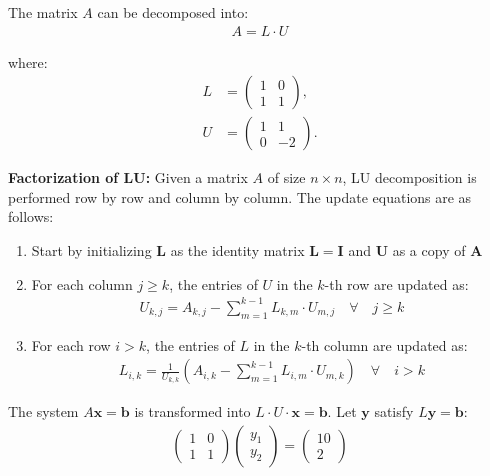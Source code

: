 \documentclass[journal]{IEEEtran}
\begin{document}
The matrix $A$ can be decomposed into:
\begin{align*}
    A = L \cdot U
\end{align*}

where:
\begin{align*}
    L &= \begin{pmatrix}
    1 & 0 \\
    1 & 1
    \end{pmatrix}, \\
    U &= \begin{pmatrix}
    1 & 1 \\
    0 & -2
    \end{pmatrix}.
\end{align*}

\textbf{Factorization of LU:}
Given a matrix $A$ of size $n \times n$, LU decomposition is performed row by row and column by column. The update equations are as follows:
\begin{enumerate}
    \item Start by initializing $\mathbf{L}$ as the identity matrix $\mathbf{L} = \mathbf{I}$ and $\mathbf{U}$ as a copy of $\mathbf{A}$
    \item For each column $j \geq k$, the entries of $U$ in the $k$-th row are updated as:
    \begin{align*}
        U_{k,j} = A_{k,j} - \sum_{m=1}^{k-1} L_{k,m} \cdot U_{m,j} \quad \forall \quad j \geq k
    \end{align*}
    \item For each row $i > k$, the entries of $L$ in the $k$-th column are updated as:
    \begin{align*}
        L_{i,k} = \frac{1}{U_{k,k}} \left(A_{i,k} - \sum_{m=1}^{k-1} L_{i,m} \cdot U_{m,k}\right) \quad \forall \quad i > k
    \end{align*}
\end{enumerate}

The system $A\mathbf{x} = \mathbf{b}$ is transformed into $L \cdot U \cdot \mathbf{x} = \mathbf{b}$. Let $\mathbf{y}$ satisfy $L\mathbf{y} = \mathbf{b}$:
\begin{align*}
    \begin{pmatrix}
    1 & 0 \\
    1 & 1
    \end{pmatrix}
    \begin{pmatrix}
    y_1 \\
    y_2
    \end{pmatrix} =
    \begin{pmatrix}
    10 \\
    2
    \end{pmatrix}
\end{align*}
\end{document}
